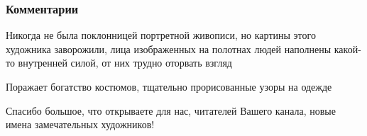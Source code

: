  
 
 
 
 
\subsubsection{Комментарии}

\begin{itemize}

Никогда не была поклонницей портретной живописи, но картины этого художника
заворожили, лица изображенных на полотнах людей наполнены какой-то внутренней
силой, от них трудно оторвать взгляд

Поражает богатство костюмов, тщательно прорисованные узоры на одежде

Спасибо большое, что открываете для нас, читателей Вашего канала, новые имена
замечательных художников!
\end{itemize}
